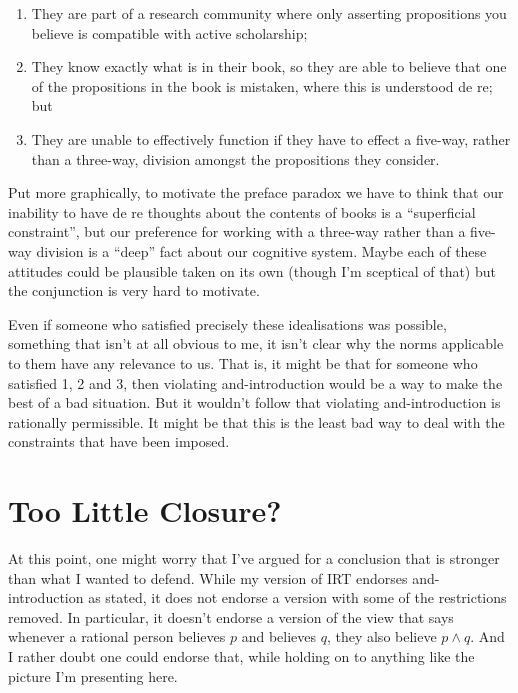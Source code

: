 \documentclass[11pt,]{book}
\providecommand{\tightlist}{%
  \setlength{\itemsep}{0pt}\setlength{\parskip}{0pt}}
\begin{document}
\begin{enumerate}
\def\labelenumi{\arabic{enumi}.}
\tightlist
\item
  They are part of a research community where only asserting propositions you believe is compatible with active scholarship;
\item
  They know exactly what is in their book, so they are able to believe that one of the propositions in the book is mistaken, where this is understood de re; but
\item
  They are unable to effectively function if they have to effect a five-way, rather than a three-way, division amongst the propositions they consider.
\end{enumerate}

Put more graphically, to motivate the preface paradox we have to think that our inability to have de re thoughts about the contents of books is a ``superficial constraint'', but our preference for working with a three-way rather than a five-way division is a ``deep'' fact about our cognitive system. Maybe each of these attitudes could be plausible taken on its own (though I'm sceptical of that) but the conjunction is very hard to motivate.

Even if someone who satisfied precisely these idealisations was possible, something that isn't at all obvious to me, it isn't clear why the norms applicable to them have any relevance to us. That is, it might be that for someone who satisfied 1, 2 and 3, then violating and-introduction would be a way to make the best of a bad situation. But it wouldn't follow that violating and-introduction is rationally permissible. It might be that this is the least bad way to deal with the constraints that have been imposed.

\hypertarget{toolittleclosure}{%
\section{Too Little Closure?}\label{toolittleclosure}}

At this point, one might worry that I've argued for a conclusion that is stronger than what I wanted to defend. While my version of IRT endorses and-introduction as stated, it does not endorse a version with some of the restrictions removed. In particular, it doesn't endorse a version of the view that says whenever a rational person believes \(p\) and believes \(q\), they also believe \(p \wedge q\). And I rather doubt one could endorse that, while holding on to anything like the picture I'm presenting here.
\end{document}
